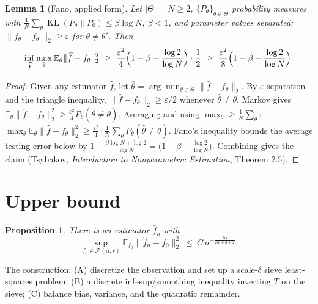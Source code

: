 \documentclass[11pt]{article}
\newtheorem{lemma}[theorem]{Lemma}
\newtheorem{proposition}[theorem]{Proposition}
\theoremstyle{remark}
\newcommand{\E}{\mathbb{E}}
\newcommand{\F}{\mathcal{F}}
\newcommand{\norm}[1]{\lVert #1\rVert}
\newcommand{\abs}[1]{\lvert #1\rvert}
\newcommand{\SET}[1]{\{#1\}}
\begin{document}
\begin{lemma}[Fano, applied form]\label{lem:fano}
Let $\abs{\Theta}=N\ge2$, $\SET{P_\theta}_{\theta\in\Theta}$ probability
measures with $\frac1N\sum_\theta\operatorname{KL}(P_\theta\|P_0)\le\beta\log N$,
$\beta<1$, and parameter values separated:
$\norm{f_\theta-f_{\theta'}}_2\ge\varepsilon$ for $\theta\ne\theta'$. Then
\[
\inf_{\widehat f}\max_{\theta}\E_{\theta}\norm{\widehat f-f_\theta}_2^{2}
\ \ge\ \frac{\varepsilon^{2}}{4}\Bigl(1-\beta-\frac{\log2}{\log N}\Bigr)\cdot\frac1{2}
\ \ge\ \frac{\varepsilon^{2}}{8}\Bigl(1-\beta-\frac{\log2}{\log N}\Bigr).
\]
\end{lemma}
\begin{proof}
Given any estimator $\widehat f$, let
$\widehat\theta=\arg\min_{\theta\in\Theta}\norm{\widehat f-f_\theta}_2$. By
$\varepsilon$-separation and the triangle inequality,
$\norm{\widehat f-f_\theta}_2\ge\varepsilon/2$ whenever
$\widehat\theta\ne\theta$. Markov gives
$\E_\theta\norm{\widehat f-f_\theta}_2^{2}\ge\frac{\varepsilon^{2}}{4}
P_\theta(\widehat\theta\ne\theta)$. Averaging and using
$\max_\theta\ge\frac1N\sum_\theta$:
$\max_\theta\E_\theta\norm{\widehat f-f_\theta}_2^{2}
\ge\frac{\varepsilon^{2}}{4}\cdot\frac1N\sum_\theta
P_\theta(\widehat\theta\ne\theta)$. Fano's inequality bounds the average
testing error below by
$1-\frac{\beta\log N+\log2}{\log N}=\bigl(1-\beta-\frac{\log2}{\log N}\bigr)$.
Combining gives the claim (Tsybakov, \emph{Introduction to Nonparametric
Estimation}, Theorem 2.5).
\end{proof}

\section{Upper bound}\label{sec:upper}

\begin{proposition}\label{prop:upper}
There is an estimator $\widehat f_n$ with
\[
\sup_{f_0\in\F(\alpha,r)}
\E_{f_0}\norm{\widehat f_n-f_0}_{2}^{2}
\ \le\ C\,n^{-\frac{2\alpha}{2\alpha+d+2}} .
\]
\end{proposition}

The construction: (A) discretize the observation and set up a
scale-$\delta$ sieve least-squares problem; (B) a discrete
inf--sup/smoothing inequality inverting $T$ on the sieve; (C) balance
bias, variance, and the quadratic remainder.
\end{document}
